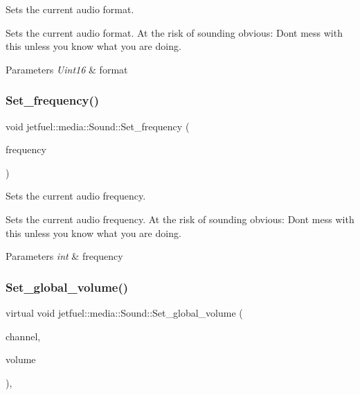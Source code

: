 Sets the current audio format. 

Sets the current audio format. At the risk of sounding obvious\+: Don\textquotesingle{}t mess with this unless you know what you are doing.


\begin{DoxyParams}{Parameters}
{\em Uint16} & format \\
\hline
\end{DoxyParams}
\mbox{\label{classjetfuel_1_1media_1_1Sound_af67e7d4f9d1509b1a8dcea3e3a7860c8}} 
\subsubsection{\texorpdfstring{Set\+\_\+frequency()}{Set\_frequency()}}
{\footnotesize\ttfamily void jetfuel\+::media\+::\+Sound\+::\+Set\+\_\+frequency (\begin{DoxyParamCaption}\item[{const int}]{frequency }\end{DoxyParamCaption})\hspace{0.3cm}{\ttfamily [inline]}}



Sets the current audio frequency. 

Sets the current audio frequency. At the risk of sounding obvious\+: Don\textquotesingle{}t mess with this unless you know what you are doing.


\begin{DoxyParams}{Parameters}
{\em int} & frequency \\
\hline
\end{DoxyParams}
\mbox{\label{classjetfuel_1_1media_1_1Sound_a4dec23a59c74ddbdf10386205e68cb29}} 
\subsubsection{\texorpdfstring{Set\+\_\+global\+\_\+volume()}{Set\_global\_volume()}}
{\footnotesize\ttfamily virtual void jetfuel\+::media\+::\+Sound\+::\+Set\+\_\+global\+\_\+volume (\begin{DoxyParamCaption}\item[{const unsigned int}]{channel,  }\item[{const int}]{volume }\end{DoxyParamCaption})\hspace{0.3cm}{\ttfamily [inline]}, {\ttfamily [virtual]}}



